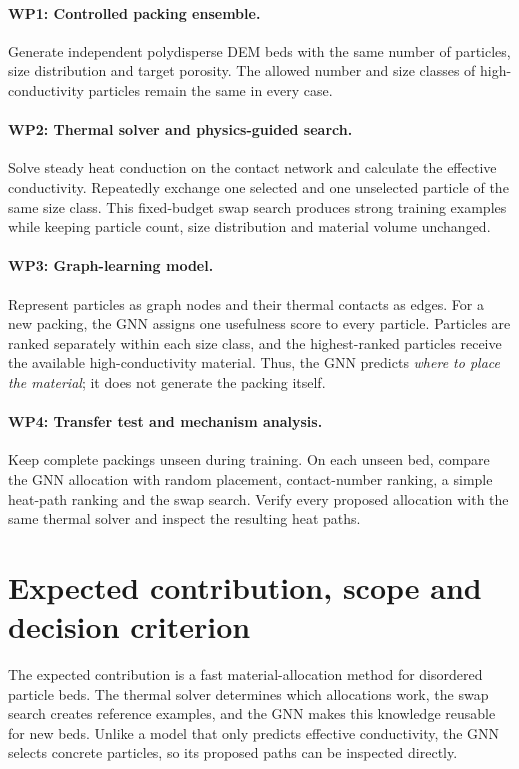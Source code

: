 \documentclass[10pt,a4paper]{article}
\begin{document}
\paragraph{WP1: Controlled packing ensemble.}
Generate independent polydisperse DEM beds with the same number of particles,
size distribution and target porosity. The allowed number and size classes of
high-conductivity particles remain the same in every case.

\paragraph{WP2: Thermal solver and physics-guided search.}
Solve steady heat conduction on the contact network and calculate the effective
conductivity. Repeatedly exchange one selected and one unselected particle of
the same size class. This fixed-budget swap search produces strong training
examples while keeping particle count, size distribution and material volume
unchanged.

\paragraph{WP3: Graph-learning model.}
Represent particles as graph nodes and their thermal contacts as edges. For a
new packing, the GNN assigns one usefulness score to every particle. Particles
are ranked separately within each size class, and the highest-ranked particles
receive the available high-conductivity material. Thus, the GNN predicts
\emph{where to place the material}; it does not generate the packing itself.

\paragraph{WP4: Transfer test and mechanism analysis.}
Keep complete packings unseen during training. On each unseen bed, compare the
GNN allocation with random placement, contact-number ranking, a simple
heat-path ranking and the swap search. Verify every proposed allocation with
the same thermal solver and inspect the resulting heat paths.

\section{\hspace{0.25em}Expected contribution, scope and decision criterion}
The expected contribution is a fast material-allocation method for disordered
particle beds. The thermal solver determines which allocations work, the swap
search creates reference examples, and the GNN makes this knowledge reusable
for new beds. Unlike a model that only predicts effective conductivity, the GNN
selects concrete particles, so its proposed paths can be inspected directly.
\end{document}

